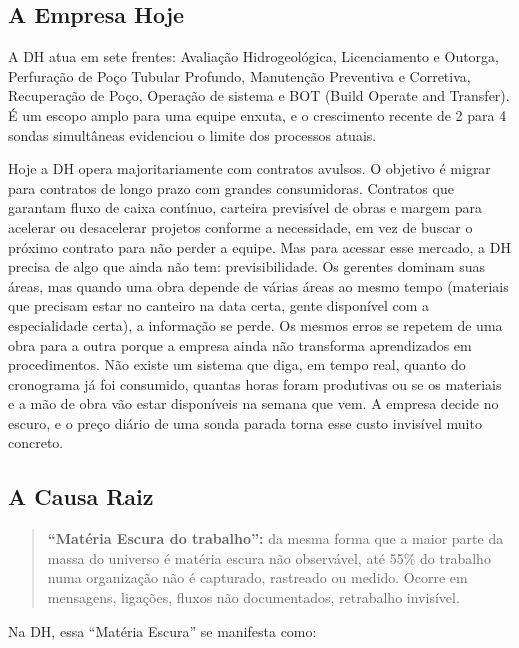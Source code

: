 \documentclass[12pt,a4paper]{scrartcl}
\begin{document}
\subsection{A Empresa Hoje}

A DH atua em sete frentes: Avaliação Hidrogeológica, Licenciamento e Outorga, Perfuração de Poço Tubular Profundo, Manutenção Preventiva e Corretiva, Recuperação de Poço, Operação de sistema e BOT (Build Operate and Transfer). É um escopo amplo para uma equipe enxuta, e o crescimento recente de 2 para 4 sondas simultâneas evidenciou o limite dos processos atuais.

Hoje a DH opera majoritariamente com contratos avulsos. O objetivo é migrar para contratos de longo prazo com grandes consumidoras. Contratos que garantam fluxo de caixa contínuo, carteira previsível de obras e margem para acelerar ou desacelerar projetos conforme a necessidade, em vez de buscar o próximo contrato para não perder a equipe. Mas para acessar esse mercado, a DH precisa de algo que ainda não tem: previsibilidade. Os gerentes dominam suas áreas, mas quando uma obra depende de várias áreas ao mesmo tempo (materiais que precisam estar no canteiro na data certa, gente disponível com a especialidade certa), a informação se perde. Os mesmos erros se repetem de uma obra para a outra porque a empresa ainda não transforma aprendizados em procedimentos. Não existe um sistema que diga, em tempo real, quanto do cronograma já foi consumido, quantas horas foram produtivas ou se os materiais e a mão de obra vão estar disponíveis na semana que vem. A empresa decide no escuro, e o preço diário de uma sonda parada torna esse custo invisível muito concreto.

\subsection{A Causa Raiz}

\begin{quote}
\textbf{``Matéria Escura do trabalho'':} da mesma forma que a maior parte da massa do universo é matéria escura não observável, até 55\% do trabalho numa organização não é capturado, rastreado ou medido. Ocorre em mensagens, ligações, fluxos não documentados, retrabalho invisível.
\end{quote}

Na DH, essa ``Matéria Escura'' se manifesta como:
\end{document}
